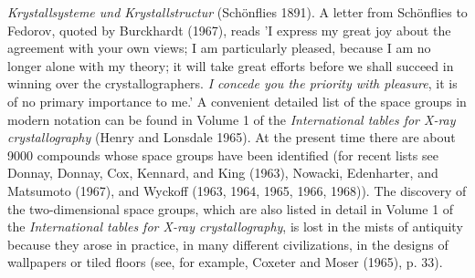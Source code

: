 \documentclass[11pt,a4paper,twoside,openright]{book}
\begin{document}
\textit{Krystallsysteme und Krystallstructur} (Schönflies 1891). A letter from Schönflies to Fedorov, quoted by Burckhardt (1967), reads 'I express my great joy about the agreement with your own views; I am particularly pleased, because I am no longer alone with my theory; it will take great efforts before we shall succeed in winning over the crystallographers. \textit{I concede you the priority with pleasure}, it is of no primary importance to me.' A convenient detailed list of the space groups in modern notation can be found in Volume 1 of the \textit{International tables for X-ray crystallography} (Henry and Lonsdale 1965). At the present time there are about 9000 compounds whose space groups have been identified (for recent lists see Donnay, Donnay, Cox, Kennard, and King (1963), Nowacki, Edenharter, and Matsumoto (1967), and Wyckoff (1963, 1964, 1965, 1966, 1968)). The discovery of the two-dimensional space groups, which are also listed in detail in Volume 1 of the \textit{International tables for X-ray crystallography}, is lost in the mists of antiquity because they arose in practice, in many different civilizations, in the designs of wallpapers or tiled floors (see, for example, Coxeter and Moser (1965), p. 33).
\end{document}
